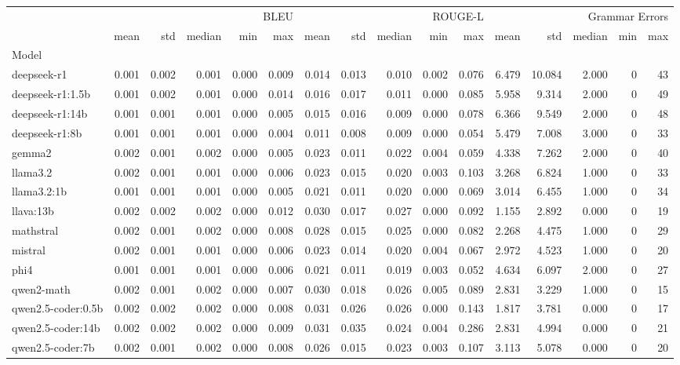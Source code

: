 \begin{tabular}{lrrrrrrrrrrrrrrr}
\toprule
 & \multicolumn{5}{r}{BLEU} & \multicolumn{5}{r}{ROUGE-L} & \multicolumn{5}{r}{Grammar Errors} \\
 & mean & std & median & min & max & mean & std & median & min & max & mean & std & median & min & max \\
Model &  &  &  &  &  &  &  &  &  &  &  &  &  &  &  \\
\midrule
deepseek-r1 & 0.001 & 0.002 & 0.001 & 0.000 & 0.009 & 0.014 & 0.013 & 0.010 & 0.002 & 0.076 & 6.479 & 10.084 & 2.000 & 0 & 43 \\
deepseek-r1:1.5b & 0.001 & 0.002 & 0.001 & 0.000 & 0.014 & 0.016 & 0.017 & 0.011 & 0.000 & 0.085 & 5.958 & 9.314 & 2.000 & 0 & 49 \\
deepseek-r1:14b & 0.001 & 0.001 & 0.001 & 0.000 & 0.005 & 0.015 & 0.016 & 0.009 & 0.000 & 0.078 & 6.366 & 9.549 & 2.000 & 0 & 48 \\
deepseek-r1:8b & 0.001 & 0.001 & 0.001 & 0.000 & 0.004 & 0.011 & 0.008 & 0.009 & 0.000 & 0.054 & 5.479 & 7.008 & 3.000 & 0 & 33 \\
gemma2 & 0.002 & 0.001 & 0.002 & 0.000 & 0.005 & 0.023 & 0.011 & 0.022 & 0.004 & 0.059 & 4.338 & 7.262 & 2.000 & 0 & 40 \\
llama3.2 & 0.002 & 0.001 & 0.001 & 0.000 & 0.006 & 0.023 & 0.015 & 0.020 & 0.003 & 0.103 & 3.268 & 6.824 & 1.000 & 0 & 33 \\
llama3.2:1b & 0.001 & 0.001 & 0.001 & 0.000 & 0.005 & 0.021 & 0.011 & 0.020 & 0.000 & 0.069 & 3.014 & 6.455 & 1.000 & 0 & 34 \\
llava:13b & 0.002 & 0.002 & 0.002 & 0.000 & 0.012 & 0.030 & 0.017 & 0.027 & 0.000 & 0.092 & 1.155 & 2.892 & 0.000 & 0 & 19 \\
mathstral & 0.002 & 0.001 & 0.002 & 0.000 & 0.008 & 0.028 & 0.015 & 0.025 & 0.000 & 0.082 & 2.268 & 4.475 & 1.000 & 0 & 29 \\
mistral & 0.002 & 0.001 & 0.001 & 0.000 & 0.006 & 0.023 & 0.014 & 0.020 & 0.004 & 0.067 & 2.972 & 4.523 & 1.000 & 0 & 20 \\
phi4 & 0.001 & 0.001 & 0.001 & 0.000 & 0.006 & 0.021 & 0.011 & 0.019 & 0.003 & 0.052 & 4.634 & 6.097 & 2.000 & 0 & 27 \\
qwen2-math & 0.002 & 0.001 & 0.002 & 0.000 & 0.007 & 0.030 & 0.018 & 0.026 & 0.005 & 0.089 & 2.831 & 3.229 & 1.000 & 0 & 15 \\
qwen2.5-coder:0.5b & 0.002 & 0.002 & 0.002 & 0.000 & 0.008 & 0.031 & 0.026 & 0.026 & 0.000 & 0.143 & 1.817 & 3.781 & 0.000 & 0 & 17 \\
qwen2.5-coder:14b & 0.002 & 0.002 & 0.002 & 0.000 & 0.009 & 0.031 & 0.035 & 0.024 & 0.004 & 0.286 & 2.831 & 4.994 & 0.000 & 0 & 21 \\
qwen2.5-coder:7b & 0.002 & 0.001 & 0.002 & 0.000 & 0.008 & 0.026 & 0.015 & 0.023 & 0.003 & 0.107 & 3.113 & 5.078 & 0.000 & 0 & 20 \\
\bottomrule
\end{tabular}
